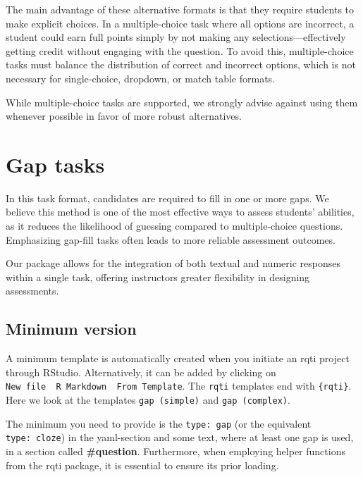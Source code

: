 \documentclass[twoside]{tufte-book}
\begin{document}
The main advantage of these alternative formats is that they require students to make explicit choices. In a multiple-choice task where all options are incorrect, a student could earn full points simply by not making any selections---effectively getting credit without engaging with the question. To avoid this, multiple-choice tasks must balance the distribution of correct and incorrect options, which is not necessary for single-choice, dropdown, or match table formats.

While multiple-choice tasks are supported, we strongly advise against using them whenever possible in favor of more robust alternatives.

\chapter{Gap tasks}\label{gap-tasks}

In this task format, candidates are required to fill in one or more gaps. We believe this method is one of the most effective ways to assess students' abilities, as it reduces the likelihood of guessing compared to multiple-choice questions. Emphasizing gap-fill tasks often leads to more reliable assessment outcomes.

Our package allows for the integration of both textual and numeric responses within a single task, offering instructors greater flexibility in designing assessments.

\section{Minimum version}\label{minimum-version-2}

A minimum template is automatically created when you initiate an rqti project through RStudio. Alternatively, it can be added by clicking on \texttt{New\ file\ \textrightarrow{}\ R\ Markdown\ \textrightarrow{}\ From\ Template}. The \texttt{rqti} templates end with \texttt{\{rqti\}}. Here we look at the templates \texttt{gap\ (simple)} and \texttt{gap\ (complex)}.

The minimum you need to provide is the \texttt{type:\ gap} (or the equivalent \texttt{type:\ cloze}) in the yaml-section and some text, where at least one gap is used, in a section called \textbf{\#question}. Furthermore, when employing helper functions from the rqti package, it is essential to ensure its prior loading.
\end{document}
